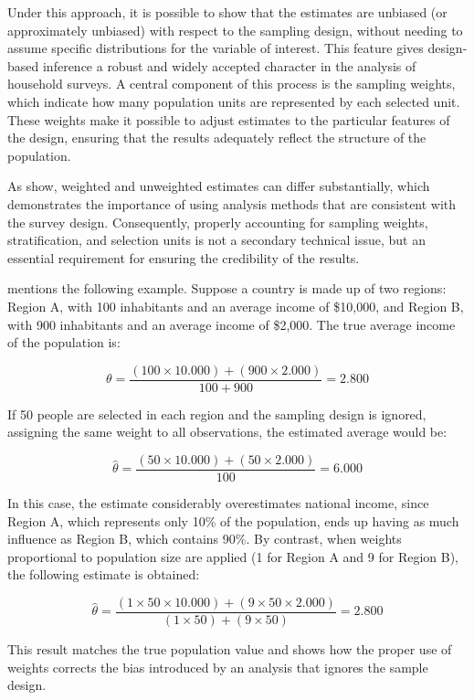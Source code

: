 \documentclass[
  english,
  12pt,
]{book}
\begin{document}
Under this approach, it is possible to show that the estimates are unbiased (or approximately unbiased) with respect to the sampling design, without needing to assume specific distributions for the variable of interest. This feature gives design-based inference a robust and widely accepted character in the analysis of household surveys. A central component of this process is the sampling weights, which indicate how many population units are represented by each selected unit. These weights make it possible to adjust estimates to the particular features of the design, ensuring that the results adequately reflect the structure of the population.

As \citet{korn1995analysis} show, weighted and unweighted estimates can differ substantially, which demonstrates the importance of using analysis methods that are consistent with the survey design. Consequently, properly accounting for sampling weights, stratification, and selection units is not a secondary technical issue, but an essential requirement for ensuring the credibility of the results.

\citet{UNhandbook} mentions the following example. Suppose a country is made up of two regions: Region A, with 100 inhabitants and an average income of \$10,000, and Region B, with 900 inhabitants and an average income of \$2,000. The true average income of the population is:

\[
\theta = \frac{(100 \times 10.000) + (900 \times 2.000)}{100 + 900} = 2.800
\]

If 50 people are selected in each region and the sampling design is ignored, assigning the same weight to all observations, the estimated average would be:

\[
\hat{\theta} = \frac{(50 \times 10.000) + (50 \times 2.000)}{100} = 6.000
\]

In this case, the estimate considerably overestimates national income, since Region A, which represents only 10\% of the population, ends up having as much influence as Region B, which contains 90\%. By contrast, when weights proportional to population size are applied (1 for Region A and 9 for Region B), the following estimate is obtained:

\[
\hat{\theta} = \frac{(1 \times 50 \times 10.000) + (9 \times 50 \times 2.000)}{(1 \times 50) + (9 \times 50)} = 2.800
\]

This result matches the true population value and shows how the proper use of weights corrects the bias introduced by an analysis that ignores the sample design.
\end{document}
